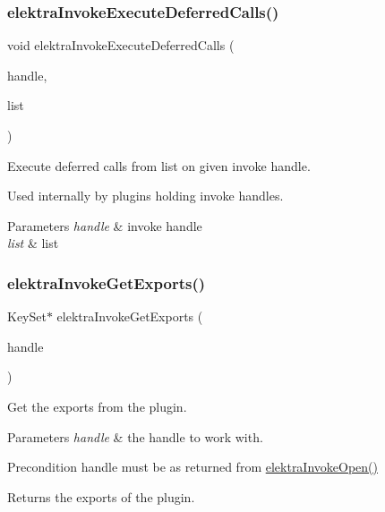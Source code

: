 \subsubsection{\texorpdfstring{elektraInvokeExecuteDeferredCalls()}{elektraInvokeExecuteDeferredCalls()}}
{\footnotesize\ttfamily void elektra\+Invoke\+Execute\+Deferred\+Calls (\begin{DoxyParamCaption}\item[{Elektra\+Invoke\+Handle $\ast$}]{handle,  }\item[{Elektra\+Deferred\+Call\+List $\ast$}]{list }\end{DoxyParamCaption})}



Execute deferred calls from list on given invoke handle. 

Used internally by plugins holding invoke handles.


\begin{DoxyParams}{Parameters}
{\em handle} & invoke handle \\
\hline
{\em list} & list \\
\hline
\end{DoxyParams}
\mbox{\label{group__invoke_ga6ab386aba337d8d3fd7978070d613efe}} 
\subsubsection{\texorpdfstring{elektraInvokeGetExports()}{elektraInvokeGetExports()}}
{\footnotesize\ttfamily Key\+Set$\ast$ elektra\+Invoke\+Get\+Exports (\begin{DoxyParamCaption}\item[{Elektra\+Invoke\+Handle $\ast$}]{handle }\end{DoxyParamCaption})}



Get the exports from the plugin. 


\begin{DoxyParams}{Parameters}
{\em handle} & the handle to work with.\\
\hline
\end{DoxyParams}
\begin{DoxyPrecond}{Precondition}
handle must be as returned from \mbox{\hyperlink{group__invoke_ga3eb20131e9a8fc9a6cebf126927c09bc}{elektra\+Invoke\+Open()}}
\end{DoxyPrecond}
\begin{DoxyReturn}{Returns}
the exports of the plugin. 
\end{DoxyReturn}
\mbox{\label{group__invoke_ga4531a643a71a63c19c94d87bd8d0b40f}} 
